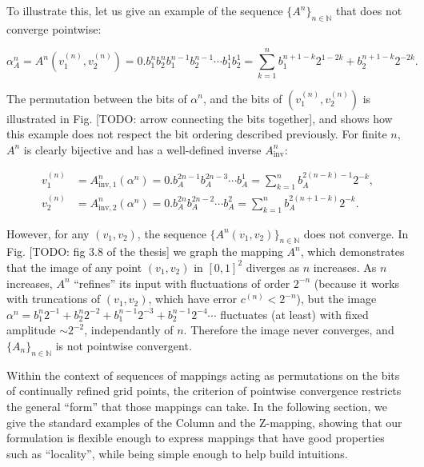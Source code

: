 \documentclass[10pt,letterpaper]{article}
\begin{document}
To illustrate this, let us give an example of the sequence $\{A^n\}_{n \in \mathbb N}$ that does not converge pointwise:

\begin{equation*}
\alpha_A^n = A^n(v_1^{(n)},v_2^{(n)}) = 0.b_1^n b_2^n b_1^{n-1} b_2^{n-1} \cdots b_1^1 b_2^1 = \sum_{k=1}^n b_1^{n+1-k} 2^{1-2k} + b_2^{n+1-k} 2^{-2k}.
\end{equation*}

The permutation between the bits of $\alpha^n$, and the bits of $(v_1^{(n)}, v_2^{(n)})$ is illustrated in Fig. [TODO: arrow connecting the bits together], and shows how this example does not respect the bit ordering described previously.
For finite $n$, $A^n$ is clearly bijective and has a well-defined inverse $A^n_\textrm{inv}$:

\begin{equation*} \begin{aligned}
v_1^{(n)} &= A^n_{\textrm{inv},1}(\alpha^n) = 0.b_A^{2n-1} b_A^{2n-3} \cdots b_A^1 = \sum_{k=1}^n b_A^{2(n-k)-1} 2^{-k}, \\
v_2^{(n)} &= A^n_{\textrm{inv},2}(\alpha^n) = 0.b_A^{2n} b_A^{2n-2} \cdots b_A^2 = \sum_{k=1}^n b_A^{2(n+1-k)} 2^{-k}.
\end{aligned} \end{equation*}

However, for any $(v_1,v_2)$, the sequence $\{A^n(v_1, v_2)\}_{n \in \mathbb N}$ does not converge. In Fig. [TODO: fig 3.8 of the thesis] we graph the mapping $A^n$, which demonstrates that the image of any point $(v_1,v_2)$ in $[0,1]^2$ diverges as $n$ increases. As $n$ increases, $A^n$ ``refines'' its input with fluctuations of order $2^{-n}$ (because it works with truncations of $(v_1, v_2)$, which have error $c^{(n)} < 2^{-n}$), but the image $\alpha^n=b_1^n 2^{-1} + b_2^n 2^{-2} + b_1^{n-1} 2^{-3} + b_2^{n-1} 2^{-4} \cdots$ fluctuates (at least) with fixed amplitude $\sim 2^{-2}$, independantly of $n$. Therefore the image never converges, and $\{A_n\}_{n \in \mathbb N}$ is not pointwise convergent.

Within the context of sequences of mappings acting as permutations on the bits of continually refined grid points, the criterion of pointwise convergence restricts the general ``form'' that those mappings can take.
In the following section, we give the standard examples of the Column and the Z-mapping, showing that our formulation is flexible enough to express mappings that have good properties such as ``locality'', while being simple enough to help build intuitions.
\end{document}
